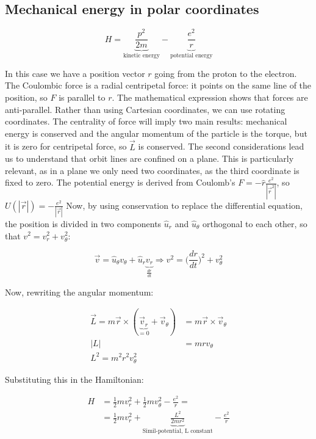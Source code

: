   \subsection{Mechanical energy in polar coordinates}

  $$H = \underbrace{\frac{p^2}{2m}}_{\text{kinetic energy}}-\underbrace{\frac{e^2}{r}}_{\text{potential energy}}$$

  In this case we have a position vector $r$ going from the proton to the electron.
  The Coulombic force is a radial centripetal force: it points on the same line of the position, so $F$ is parallel to $r$.
  The mathematical expression shows that forces are anti-parallel.
  Rather than using Cartesian coordinates, we can use rotating coordinates.
  The centrality of force will imply two main results: mechanical energy is conserved and the angular momentum  of the particle is the torque, but it is zero for centripetal force, so $\vec{L}$ is conserved.
  The second considerations lead us to understand that orbit lines are confined on a plane. This is particularly relevant, as in a plane we only need two coordinates, as the third coordinate is fixed to zero.
  The potential energy is derived from Coulomb's $F=-\hat{r}\frac{e^2}{|\vec{r}^2|}$, so $U(|\vec{r}|) = -\frac{e^2}{|\vec{r}|}$
  Now, by using conservation to replace the differential equation, the position is divided in two components $\hat{u}_r$ and $\hat{u}_\theta$ orthogonal to each other, so that $v^2 = v_r^2+v_\theta^2$:

  $$\vec{v} = \hat{u}_\theta v_\theta +\hat{u}_r\underbrace{v_r}_{\frac{d{r}}{d{t}}}\Rightarrow v^2 = \biggl(\frac{d{r}}{d{t}}\biggr)^2+v_\theta^2$$

  Now, rewriting the angular momentum:

  \begin{align*}
    \vec{L} = m \vec{r}\times(\underbrace{\vec{v}_r}_{=0}+\vec{v}_\theta) &= m \vec{r}\times\vec{v}_\theta\\
    |L| &= mrv_\theta\\
    L^2 = m^2r^2v_\theta^2
  \end{align*}

  Substituting this in the Hamiltonian:

  \begin{align*}
    H &= \frac{1}{2}mv_r^2 + \frac{1}{2}mv_\theta^2 - \frac{e^2}{r}=\\
      &=\frac{1}{2}mv_r^2 + \underbrace{\frac{L^2}{2mr^2}}_{\text{Simil-potential, L constant}} - \frac{e^2}{r}
  \end{align*}

